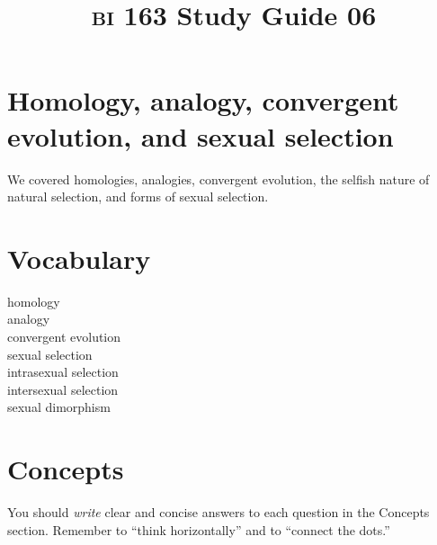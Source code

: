 \documentclass[letterpaper]{tufte-handout}
\title{{\scshape bi} 163 Study Guide 06}
\date{} %
\begin{document}
\maketitle	%

\section*{Homology, analogy, convergent evolution, and sexual selection}

We covered homologies, analogies, convergent evolution, the selfish nature of natural selection, and forms of sexual selection.

\section*{Vocabulary}

\vspace{-1\baselineskip}
\begin{multicols}{2}
homology \\
analogy\\
convergent evolution \\
sexual selection\\
intrasexual selection\\
intersexual selection\\
sexual dimorphism

\end{multicols}

\section*{Concepts}

You should \emph{write} clear and concise answers to each question in the Concepts section.  Remember to ``think horizontally'' and to ``connect the dots.'' 
\end{document}

